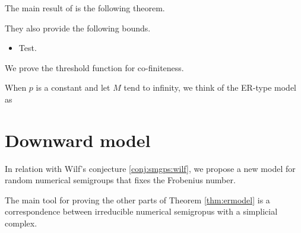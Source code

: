 The main result of \cite{de2018random} is the following theorem.  

\begin{theorem}\label{thm:ermodel}
    
\end{theorem}

They also provide the following bounds.
\begin{itemize}
    \item Test. 
\end{itemize}

We prove the threshold function for co-finiteness. 

\begin{theorem}
    
\end{theorem}

When $p$ is a constant and let $M$ tend to infinity, we think of the ER-type model as 

\section{Downward model}\label{sec:contrib1:theme2}

In relation with Wilf's conjecture \ref{conj:smgps:wilf}, we propose a new model for random numerical semigroups that fixes the Frobenius number.

The main tool for proving the other parts of Theorem \ref{thm:ermodel} is a correspondence between irreducible numerical semigropus with a simplicial complex. 

\begin{definition}
    
\end{definition}

